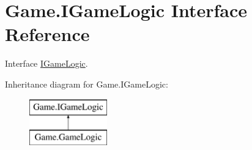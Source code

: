 \hypertarget{interface_game_1_1_i_game_logic}{}\section{Game.\+I\+Game\+Logic Interface Reference}
\label{interface_game_1_1_i_game_logic}


Interface \mbox{\hyperlink{interface_game_1_1_i_game_logic}{I\+Game\+Logic}}.  


Inheritance diagram for Game.\+I\+Game\+Logic\+:\begin{figure}[H]
\begin{center}
\leavevmode
\includegraphics[height=2.000000cm]{interface_game_1_1_i_game_logic}
\end{center}
\end{figure}
